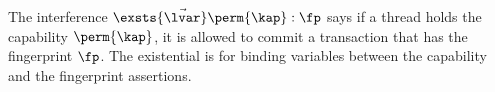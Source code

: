 

The interference \( \exsts{\vec{\lvar}} \perm{\kap} : \fp \) says if a thread holds the capability \( \perm{\kap} \), it is allowed to commit a transaction that has the fingerprint \( \fp \).
The existential is for binding variables between the capability and the fingerprint assertions.

